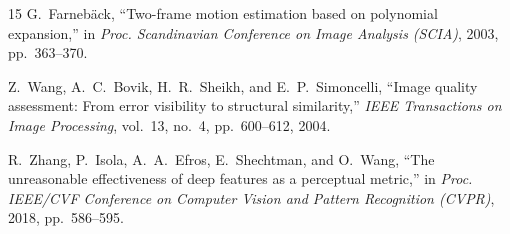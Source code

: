 \documentclass{article}
\begin{document}
\begin{thebibliography}{15}
G.~Farneb\"{a}ck,
``Two-frame motion estimation based on polynomial expansion,''
in \textit{Proc. Scandinavian Conference on Image Analysis (SCIA)}, 2003, pp.~363--370.

Z.~Wang, A.~C.~Bovik, H.~R.~Sheikh, and E.~P.~Simoncelli,
``Image quality assessment: From error visibility to structural similarity,''
\textit{IEEE Transactions on Image Processing}, vol.~13, no.~4, pp.~600--612, 2004.

R.~Zhang, P.~Isola, A.~A.~Efros, E.~Shechtman, and O.~Wang,
``The unreasonable effectiveness of deep features as a perceptual metric,''
in \textit{Proc. IEEE/CVF Conference on Computer Vision and Pattern Recognition (CVPR)}, 2018, pp.~586--595.

\end{thebibliography}
\end{document}
